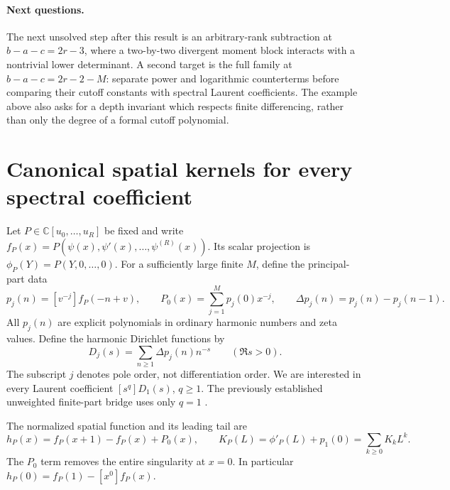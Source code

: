 \documentclass[11pt,letterpaper]{article}
\numberwithin{equation}{section}
\theoremstyle{plain}
\theoremstyle{definition}
\theoremstyle{remark}
\begin{document}
\paragraph{Next questions.}
The next unsolved step after this result is an arbitrary-rank
subtraction at $b-a-c=2r-3$, where a two-by-two divergent moment
block interacts with a nontrivial lower determinant.  A second
target is the full family at $b-a-c=2r-2-M$: separate power and
logarithmic counterterms before comparing their cutoff constants
with spectral Laurent coefficients.  The example above also asks
for a depth invariant which respects finite differencing, rather
than only the degree of a formal cutoff polynomial.



\section{Canonical spatial kernels for every spectral coefficient}
\label{log:section}

Let $P\in\mathbb C[u_0,\ldots,u_R]$ be fixed and write
$f_P(x)=P(\psi(x),\psi'(x),\ldots,\psi^{(R)}(x))$.
Its scalar projection is $\phi_P(Y)=P(Y,0,\ldots,0)$.
For a sufficiently large finite $M$, define the principal-part data
\[
 p_j(n)=[v^{-j}]f_P(-n+v),\qquad
 P_0(x)=\sum_{j=1}^M p_j(0)x^{-j},\qquad
 \Delta p_j(n)=p_j(n)-p_j(n-1).
\]
All $p_j(n)$ are explicit polynomials in ordinary harmonic numbers
and zeta values. Define the harmonic Dirichlet functions by
\begin{equation}\label{log:Dirichlet}
 D_j(s)=\sum_{n\ge1}\Delta p_j(n)n^{-s}\qquad(\Re s>0).
\end{equation}
The subscript $j$ denotes pole order, not differentiation order.
We are interested in every Laurent coefficient $[s^q]D_1(s)$,
$q\ge1$. The previously established unweighted finite-part bridge
uses only $q=1$ \cite{DPL,PTI}.

The normalized spatial function and its leading tail are
\begin{equation}\label{log:hK}
 h_P(x)=f_P(x+1)-f_P(x)+P_0(x),\qquad
 K_P(L)=\phi'_P(L)+p_1(0)=\sum_{k\ge0}K_kL^k.
\end{equation}
The $P_0$ term removes the entire singularity at $x=0$.
In particular $h_P(0)=f_P(1)-[x^0]f_P(x)$.
\end{document}
